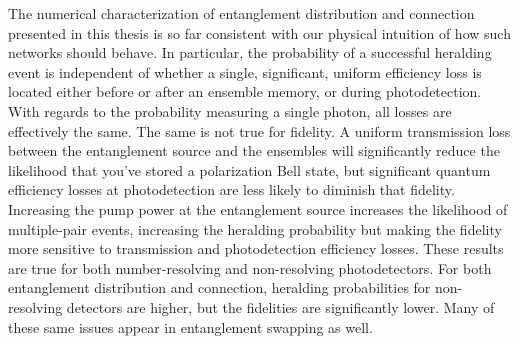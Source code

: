 \documentclass[aps,twocolumn,secnumarabic,amsmath,amssymb,pra,groupedaddress,
showpacs, showkeys]{revtex4-1}
\begin{document}

The numerical characterization of entanglement distribution and connection
presented in this thesis is so far consistent with our physical intuition of
how such networks should behave. In particular, the probability of a successful
heralding event is independent of whether a single, significant, uniform
efficiency loss is located either before or after an ensemble memory, or during
photodetection. With regards to the probability measuring a single photon, all
losses are effectively the same. The same is not true for fidelity. A uniform
transmission loss between the entanglement source and the ensembles will
significantly reduce the likelihood that you've stored a polarization Bell
state, but significant quantum efficiency losses at photodetection are less
likely to diminish that fidelity. Increasing the pump power at the entanglement
source increases the likelihood of multiple-pair events, increasing the
heralding probability but making the fidelity more sensitive to transmission
and photodetection efficiency losses. These results are true for both
number-resolving and non-resolving photodetectors. For both entanglement
distribution and connection, heralding probabilities for non-resolving
detectors are higher, but the fidelities are significantly lower. Many of these
same issues appear in entanglement swapping as well.

\end{document}
